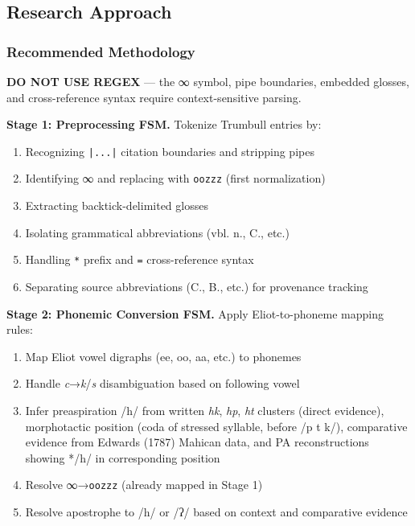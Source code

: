 \subsection{Research Approach}

\subsubsection{Recommended Methodology}

\textbf{DO NOT USE REGEX} --- the ∞ symbol, pipe boundaries, embedded
glosses, and cross-reference syntax require context-sensitive parsing.

\textbf{Stage 1: Preprocessing FSM.} Tokenize Trumbull entries by:
\begin{enumerate}
  \item Recognizing \texttt{|...|} citation boundaries and stripping pipes
  \item Identifying ∞ and replacing with \texttt{oozzz} (first normalization)
  \item Extracting backtick-delimited glosses
  \item Isolating grammatical abbreviations (vbl. n., C., etc.)
  \item Handling \texttt{*} prefix and \texttt{=} cross-reference syntax
  \item Separating source abbreviations (C., B., etc.) for provenance tracking
\end{enumerate}

\textbf{Stage 2: Phonemic Conversion FSM.} Apply Eliot-to-phoneme mapping
rules:
\begin{enumerate}
  \item Map Eliot vowel digraphs (ee, oo, aa, etc.) to phonemes
  \item Handle \textit{c}→\textit{k}/\textit{s} disambiguation based on
    following vowel
  \item Infer preaspiration /h/ from written \textit{hk}, \textit{hp},
    \textit{ht} clusters (direct evidence), morphotactic position (coda of
    stressed syllable, before /p t k/), comparative evidence from Edwards
    (1787) Mahican data, and PA reconstructions showing */h/ in corresponding
    position
  \item Resolve ∞→\texttt{oozzz} (already mapped in Stage 1)
  \item Resolve apostrophe to /h/ or /ʔ/ based on context and comparative
    evidence
\end{enumerate}

